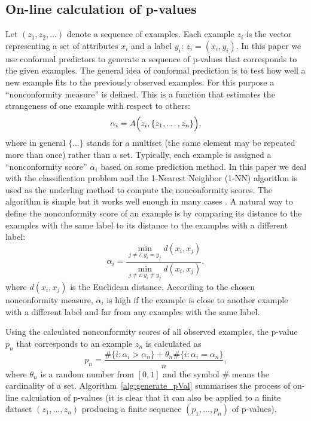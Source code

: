 \documentclass{article}
\theoremstyle{definition}
\begin{document}
\subsection{On-line calculation of p-values}

Let $(z_1, z_2, \ldots)$ denote a sequence of examples. Each example $z_i$ is the vector representing
a set of attributes $x_i$ and a label $y_i$: $z_i = (x_i,y_i)$.
In this paper we use conformal predictors to generate a sequence of p-values
that corresponds to the given examples. The general idea of conformal prediction is
to test how well a new example fits to the previously observed examples.
For this purpose a ``nonconformity measure'' is defined.
This is a function that estimates the strangeness of one example
with respect to others:
$$
  \alpha_i = A\Bigl(z_i,\{z_1,\ldots,z_n\}\Bigr),
$$
where in general $\{\ldots\}$ stands for a multiset
(the same element may be repeated more than once) rather than a set.
Typically,
each example is assigned a ``nonconformity score'' $\alpha_i$
based on some prediction method.
In this paper we deal with the classification problem and the 1-Nearest Neighbor (1-NN) algorithm is used
as the underling method to compute the nonconformity scores.
The algorithm is simple but it works well enough in many cases
\citep[see, e.g.,][pp.~422--427]{hastie:2001}.
A natural way to define the nonconformity score of an example
is by comparing its distance to the examples with the same label
to its distance to the examples with a different label:
\begin{equation}\label{eq:NN}
  \alpha_i = \frac{\min_{j \neq i: y_i = y_j}d(x_i,x_j)}{\min_{j \neq i: y_i \neq y_j}d(x_i,x_j)},
\end{equation}
where $d(x_i,x_j)$ is the Euclidean distance.
According to the chosen nonconformity measure,
$\alpha_i$ is high if the example is close to
another example with a different label and far from any examples with the same label.

Using the calculated nonconformity scores of all observed examples,
the p-value $p_n$ that corresponds to an example $z_n$ is calculated as
$$p_n = \frac{\#\{i: \alpha_i > \alpha_n\} + \theta_n \#\{i: \alpha_i = \alpha_n \}}{n},$$
where $\theta_n$ is a random number from $[0,1]$
and the symbol $\#$ means the cardinality of a set.
Algorithm~\ref{alg:generate_pVal} summarises the process of on-line calculation of p-values
(it is clear that it can also be applied to a finite dataset $(z_1,\ldots,z_n)$
producing a finite sequence $(p_1,\ldots,p_n)$ of p-values).
\end{document}
